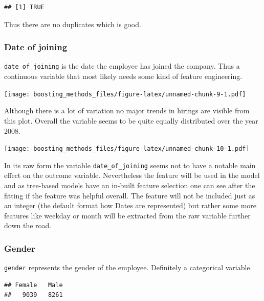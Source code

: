 \documentclass[
]{book}
\newenvironment{Shaded}{\begin{snugshade}}{\end{snugshade}}
\newcommand{\CommentTok}[1]{\textcolor[rgb]{0.56,0.35,0.01}{\textit{#1}}}
\newcommand{\FunctionTok}[1]{\textcolor[rgb]{0.00,0.00,0.00}{#1}}
\newcommand{\NormalTok}[1]{#1}
\newcommand{\SpecialCharTok}[1]{\textcolor[rgb]{0.00,0.00,0.00}{#1}}
\begin{document}
\begin{verbatim}
## [1] TRUE
\end{verbatim}

Thus there are no duplicates which is good.

\hypertarget{date-of-joining}{%
\subsubsection{Date of joining}\label{date-of-joining}}

\texttt{date\_of\_joining} is the date the employee has joined the company. Thus a continuous variable that most likely needs some kind of feature engineering.

\texttt{[image: boosting\_methods\_files/figure-latex/unnamed-chunk-9-1.pdf]}

Although there is a lot of variation no major trends in hirings are visible from this plot. Overall the variable seems to be quite equally distributed over the year 2008.

\texttt{[image: boosting\_methods\_files/figure-latex/unnamed-chunk-10-1.pdf]}

In its raw form the variable \texttt{date\_of\_joining} seems not to have a notable main effect on the outcome variable. Nevertheless the feature will be used in the model and as tree-based models have an in-built feature selection one can see after the fitting if the feature was helpful overall. The feature will not be included just as an integer (the default format how Dates are represented) but rather some more features like weekday or month will be extracted from the raw variable further down the road.

\hypertarget{gender}{%
\subsubsection{Gender}\label{gender}}

\texttt{gender} represents the gender of the employee. Definitely a categorical variable.

\begin{Shaded}
\end{Shaded}

\begin{verbatim}
## Female   Male 
##   9039   8261
\end{verbatim}
\end{document}
